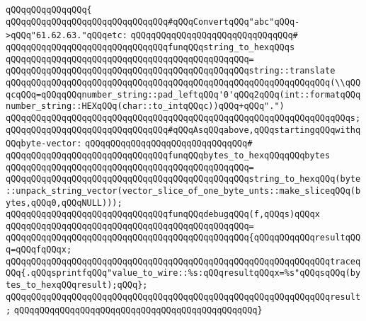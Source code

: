 \verb|qQQqqQQqqQQqqQQq{|\newline
\verb|qQQqqQQqqQQqqQQqqQQqqQQqqQQqqQQq#qQQqConvertqQQq"abc"qQQq->qQQq"61.62.63."qQQqetc:|\newline
\verb|qQQqqQQqqQQqqQQqqQQqqQQqqQQqqQQq#|\newline
\verb|qQQqqQQqqQQqqQQqqQQqqQQqqQQqqQQqfunqQQqstring_to_hexqQQqs|\newline
\verb|qQQqqQQqqQQqqQQqqQQqqQQqqQQqqQQqqQQqqQQqqQQqqQQq=|\newline
\verb|qQQqqQQqqQQqqQQqqQQqqQQqqQQqqQQqqQQqqQQqqQQqqQQqstring::translate|\newline
\verb|qQQqqQQqqQQqqQQqqQQqqQQqqQQqqQQqqQQqqQQqqQQqqQQqqQQqqQQqqQQqqQQq(\\qQQqcqQQq=qQQqqQQqnumber_string::pad_leftqQQq'0'qQQq2qQQq(int::formatqQQqnumber_string::HEXqQQq(char::to_intqQQqc))qQQq+qQQq".")|\newline
\verb|qQQqqQQqqQQqqQQqqQQqqQQqqQQqqQQqqQQqqQQqqQQqqQQqqQQqqQQqqQQqqQQqqQQqs;|\newline
\newline
\verb|qQQqqQQqqQQqqQQqqQQqqQQqqQQqqQQq#qQQqAsqQQqabove,qQQqstartingqQQqwithqQQqbyte-vector:|\newline
\verb|qQQqqQQqqQQqqQQqqQQqqQQqqQQqqQQq#|\newline
\verb|qQQqqQQqqQQqqQQqqQQqqQQqqQQqqQQqfunqQQqbytes_to_hexqQQqqQQqbytes|\newline
\verb|qQQqqQQqqQQqqQQqqQQqqQQqqQQqqQQqqQQqqQQqqQQqqQQq=|\newline
\verb|qQQqqQQqqQQqqQQqqQQqqQQqqQQqqQQqqQQqqQQqqQQqqQQqstring_to_hexqQQq(byte::unpack_string_vector(vector_slice_of_one_byte_unts::make_sliceqQQq(bytes,qQQq0,qQQqNULL)));|\newline
\newline
\verb|qQQqqQQqqQQqqQQqqQQqqQQqqQQqqQQqfunqQQqdebugqQQq(f,qQQqs)qQQqx|\newline
\verb|qQQqqQQqqQQqqQQqqQQqqQQqqQQqqQQqqQQqqQQqqQQqqQQq=|\newline
\verb|qQQqqQQqqQQqqQQqqQQqqQQqqQQqqQQqqQQqqQQqqQQqqQQq{qQQqqQQqqQQqresultqQQq=qQQqfqQQqx;|\newline
\verb|qQQqqQQqqQQqqQQqqQQqqQQqqQQqqQQqqQQqqQQqqQQqqQQqqQQqqQQqqQQqqQQqtraceqQQq{.qQQqsprintfqQQq"value_to_wire::%s:qQQqresultqQQqx=%s"qQQqsqQQq(bytes_to_hexqQQqresult);qQQq};|\newline
\verb|qQQqqQQqqQQqqQQqqQQqqQQqqQQqqQQqqQQqqQQqqQQqqQQqqQQqqQQqqQQqqQQqresult;|\newline
\verb|qQQqqQQqqQQqqQQqqQQqqQQqqQQqqQQqqQQqqQQqqQQqqQQq}|\newline
